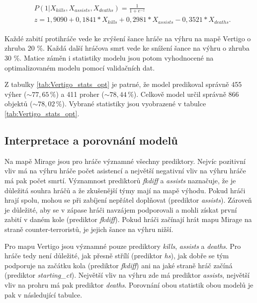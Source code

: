 \begin{align}
    \begin{split}
        &P(1 | X_{kills}, X_{assists}, X_{deaths}) = \frac{1}{1 + e^{-z}} \\
        &z = 1,9090 + 0,1841*X_{kills} + 0,2981*X_{assists} - 0,3521*X_{deaths}.
    \end{split}
\end{align}

Každé zabití protihráče vede ke zvýšení šance hráče na výhru na mapě Vertigo o zhruba 20 \%. Každá další hráčova smrt vede ke snížení šance na výhru o zhruba 30 \%. 
Matice záměn i statistiky modelu jsou potom vyhodnocené na optimalizovaném modelu pomocí validačních dat.





Z tabulky \ref{tab:Vertigo_stats_opt} je patrné, že model predikoval správně 455 výher ($\sim 77,65 \,\% $) a 411 proher ($\sim 78,44 \,\% $).
Celkově model určil správně 866 objektů ($\sim 78,02 \,\% $). Vybrané statistiky jsou vyobrazené v tabulce \ref{tab:Vertigo_stats_opt}.

\subsection{Interpretace a porovnání modelů}
Na mapě Mirage jsou pro hráče významné všechny prediktory. Nejvíc pozitivní vliv má na výhru hráče počet asistencí a největší negativní vliv
na výhru hráče má pak počet smrtí. Významnost prediktorů \textit{fkdiff} a \textit{assists} naznačuje, že je důležitá souhra hráčů a že zkušenější týmy
mají na mapě výhodu. Pokud hráči hrají spolu, mohou se při zabíjení nepřátel doplňovat (prediktor \textit{assists}). Zároveň je důležité, aby se v zápase
hráči navzájem podporovali a mohli získat první zabití v daném kole (prediktor \textit{fkdiff}). Pokud hráči začínají hrát mapu Mirage na straně counter-terroristů,
je jejich šance na výhru nižší.

Pro mapu Vertigo jsou  významné pouze prediktory \textit{kills}, \textit{assists} a \textit{deaths}. Pro hráče tedy není důležité, jak přesně
střílí (prediktor \textit{hs}), jak dobře se tým podporuje na začátku kola (prediktor \textit{fkdiff}) ani na jaké straně hráč začíná (prediktor \textit{starting\_ct}).
Největší vliv na výhru zde má prediktor \textit{assists}, největší vliv na prohru má pak prediktor \textit{deaths}. Porovnání obou statistik obou modelů je pak
v následující tabulce.

